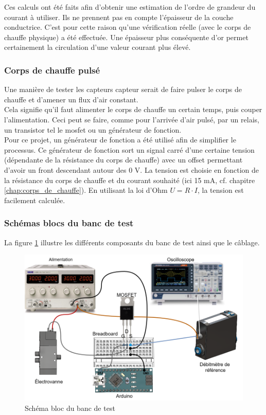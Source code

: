 Ces calculs ont été faits afin d'obtenir une estimation de l'ordre de grandeur du courant à utiliser. Ils ne prennent pas en compte l'épaisseur 
de la couche conductrice. C'est pour cette raison qu'une vérification réelle (avec le corps de chauffe physique) a été effectuée. Une épaisseur 
plus conséquente d'or permet certainement la circulation d'une valeur courant plus élevé. 

\subsubsection{Corps de chauffe pulsé}
\label{chap:corps_chauffe_pulse}
Une manière de tester les capteurs \gls{capteur} serait de faire pulser le corps de chauffe et d'amener un flux d'air constant. \\
Cela signifie qu'il faut alimenter le corps de chauffe un certain temps, puis couper l'alimentation. Ceci peut se faire, comme pour l'arrivée
d'air pulsé, par un relais, un transistor tel le \gls{mosfet} ou un générateur de fonction. \\

Pour ce projet, un générateur de fonction a été utilisé afin de simplifier le processus. Ce générateur de fonction sort un signal carré
d'une certaine tension (dépendante de la résistance du corps de chauffe) avec un offset permettant d'avoir un front descendant autour des
0 V. La tension est choisie en fonction de la résistance du corps de chauffe et du courant souhaité (ici 15 mA, cf. chapitre 
\ref{chap:corps_de_chauffe}). En utilisant la loi d'Ohm $U = R\cdot I$, la tension est facilement calculée.

\subsubsection{Schémas blocs du banc de test}
La figure \ref{fig:schema_cables} illustre les différents composants du banc de test ainsi que le câblage.
\begin{figure}[H]
    \centering
    \includegraphics[scale = 0.35]{assets/figures/cablage_electrique.png}
    \caption{Schéma bloc du banc de test}
    \label{fig:schema_cables}
\end{figure}

